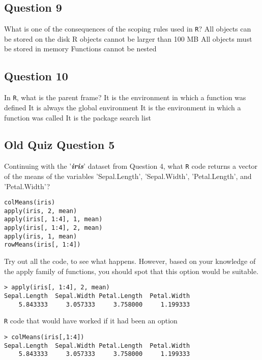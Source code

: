 \documentclass[12pt]{article}
\begin{document}
\subsection*{Question 9}
What is one of the consequences of the scoping rules used in \texttt{R}?
All objects can be stored on the disk
R objects cannot be larger than 100 MB
All objects must be stored in memory
Functions cannot be nested
\newpage
\subsection*{Question 10}
In \texttt{R}, what is the parent frame?
It is the environment in which a function was defined
It is always the global environment
It is the environment in which a function was called
It is the package search list


\newpage
\subsection*{Old Quiz Question 5} %
Continuing with the '\textit{\textbf{iris}}' dataset from Question 4, what \texttt{R} code returns a vector of the means of the variables 'Sepal.Length', 'Sepal.Width', 'Petal.Length', and 'Petal.Width'?
\begin{framed}
\begin{verbatim}
colMeans(iris)
apply(iris, 2, mean)
apply(iris[, 1:4], 1, mean)
apply(iris[, 1:4], 2, mean)
apply(iris, 1, mean)
rowMeans(iris[, 1:4])
\end{verbatim}
\end{framed}
Try out all the code, to see what happens. However, based on your knowledge of the apply family of functions, you should spot that this option would be suitable.
\begin{verbatim}
> apply(iris[, 1:4], 2, mean)
Sepal.Length  Sepal.Width Petal.Length  Petal.Width 
    5.843333     3.057333     3.758000     1.199333 
\end{verbatim}

\noindent \texttt{R} code that would have worked if it had been an option

\begin{verbatim}
> colMeans(iris[,1:4])
Sepal.Length  Sepal.Width Petal.Length  Petal.Width 
    5.843333     3.057333     3.758000     1.199333
\end{verbatim}

\end{document}
